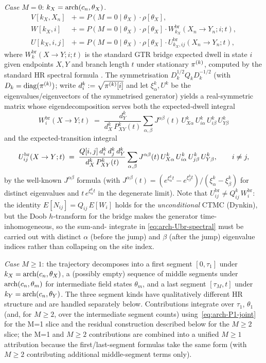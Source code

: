 \emph{Case $M = 0$}: $k_X = \mathrm{arch}(c_n, \theta_X)$.
\begin{align}
  V[k_X, X_n]  &\mathrel{+}= P(M=0 \mid \theta_X) \cdot \rho[\theta_X], \\
  W[k_X, i]    &\mathrel{+}= P(M=0 \mid \theta_X) \cdot \rho[\theta_X] \cdot
                             W^{\mathrm{br}}_{k_X}(X_n \to Y_n; i; t), \\
  U[k_X, i, j] &\mathrel{+}= P(M=0 \mid \theta_X) \cdot \rho[\theta_X] \cdot
                             U^{\mathrm{br}}_{k_X, ij}(X_n \to Y_n; t),
\end{align}
where $W^{\mathrm{br}}_k(X \to Y; i; t)$ is the standard GTR bridge
expected dwell in state $i$ given endpoints $X, Y$ and branch length
$t$ under stationary $\pi^{(k)}$, computed by the standard HR
spectral formula \citep{HolmesRubin2002}. The symmetrisation
$D_k^{1/2} Q_k D_k^{-1/2}$ (with $D_k = \mathrm{diag}(\pi^{(k)})$; write
$d^k_i := \sqrt{\pi^{(k)}[i]}$ and let $\xi^k_\alpha, U^k$ be the
eigenvalues/eigenvectors of the symmetrised generator) yields a
real-symmetric matrix whose eigendecomposition serves both the
expected-dwell integral
\[
  W_i^{\mathrm{br}}(X \to Y; t)
  \;=\; \frac{d^k_Y}{d^k_X\, P^k_{XY}(t)}
    \sum_{\alpha, \beta} J^{\alpha\beta}(t)\,
      U^k_{X\alpha}\, U^k_{i\alpha}\, U^k_{i\beta}\, U^k_{Y\beta}
\]
and the expected-transition integral
\begin{equation}
  U_{ij}^{\mathrm{br}}(X \to Y; t)
  \;=\; \frac{Q[i,j]\, d^k_i\, d^k_j\, d^k_Y}{d^k_X\, P^k_{XY}(t)}
    \sum_{\alpha, \beta} J^{\alpha\beta}(t)\,
      U^k_{X\alpha}\, U^k_{i\alpha}\, U^k_{j\beta}\, U^k_{Y\beta},
  \qquad i \ne j,
  \label{eq:arch-Ubr-spectral}
\end{equation}
by the well-known $J^{\alpha\beta}$ formula (with
$J^{\alpha\beta}(t) = (e^{\xi^k_\alpha t} - e^{\xi^k_\beta t}) /
(\xi^k_\alpha - \xi^k_\beta)$ for distinct eigenvalues and $t\,
e^{\xi^k_\alpha t}$ in the degenerate limit). Note that
$U_{ij}^{\mathrm{br}} \ne Q^k_{ij}\, W_i^{\mathrm{br}}$: the
identity $E[N_{ij}] = Q_{ij}\, E[W_i]$ holds for the
\emph{unconditional} CTMC (Dynkin), but the Doob $h$-transform for
the bridge makes the generator time-inhomogeneous, so the sum-and-
integrate in \eqref{eq:arch-Ubr-spectral} must be carried out with
distinct $\alpha$ (before the jump) and $\beta$ (after the jump)
eigenvalue indices rather than collapsing on the site index.

\emph{Case $M \geq 1$}: the trajectory decomposes into a first
segment $[0, \tau_1]$ under $k_X = \mathrm{arch}(c_n, \theta_X)$, a
(possibly empty) sequence of middle segments under
$\mathrm{arch}(c_n, \theta_m)$ for intermediate field states $\theta_m$, and
a last segment $[\tau_M, t]$ under $k_Y = \mathrm{arch}(c_n, \theta_Y)$.
The three segment kinds have qualitatively different HR structure and
are handled separately below. Contributions integrate over $\tau_1$,
$\theta_1$ (and, for $M \geq 2$, over the intermediate segment
counts) using~\eqref{eq:arch-P1-joint} for the M{=}1 slice and the
residual construction described below for the $M \geq 2$ slice; the
M{=}1 and $M \geq 2$ contributions are combined into a unified
$M \geq 1$ attribution because the first/last-segment formulas take
the same form (with $M \geq 2$ contributing additional middle-segment
terms only).

